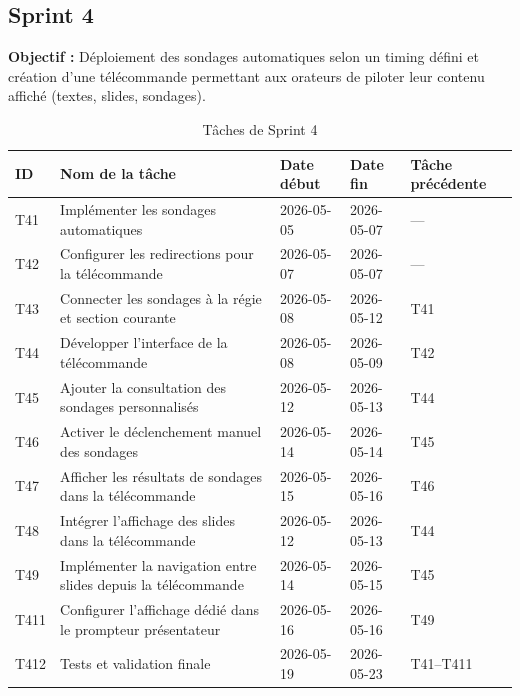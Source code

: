\vspace{1cm}   
\subsection{Sprint 4}

\textbf{Objectif :} Déploiement des sondages automatiques selon un timing défini et création
d'une télécommande permettant aux orateurs de piloter leur contenu affiché (textes, slides,
sondages).

\begin{table}[!htbp]
    \centering
    \caption{Tâches de Sprint 4}
    \begin{tabular}{p{1.2cm} p{6.5cm} p{2.2cm} p{2.2cm} p{2.0cm}}
        \toprule
        ID   & Nom de la tâche & Date début & Date fin & Tâche précédente \\
        \midrule
        T41  & Implémenter les sondages automatiques                         & 2026-05-05 & 2026-05-07 & --- \\
        T42  & Configurer les redirections pour la télécommande              & 2026-05-07 & 2026-05-07 & --- \\
        T43  & Connecter les sondages à la régie et section courante         & 2026-05-08 & 2026-05-12 & T41 \\
        T44  & Développer l'interface de la télécommande                     & 2026-05-08 & 2026-05-09 & T42 \\
        T45  & Ajouter la consultation des sondages personnalisés            & 2026-05-12 & 2026-05-13 & T44 \\
        T46  & Activer le déclenchement manuel des sondages                  & 2026-05-14 & 2026-05-14 & T45 \\
        T47  & Afficher les résultats de sondages dans la télécommande       & 2026-05-15 & 2026-05-16 & T46 \\
        T48  & Intégrer l'affichage des slides dans la télécommande          & 2026-05-12 & 2026-05-13 & T44 \\
        T49  & Implémenter la navigation entre slides depuis la télécommande & 2026-05-14 & 2026-05-15 & T45 \\
        T411 & Configurer l'affichage dédié dans le prompteur présentateur   & 2026-05-16 & 2026-05-16 & T49 \\
        T412 & Tests et validation finale                                     & 2026-05-19 & 2026-05-23 & T41--T411 \\
        \bottomrule
    \end{tabular}
    \label{tab:sprint4}
\end{table}

